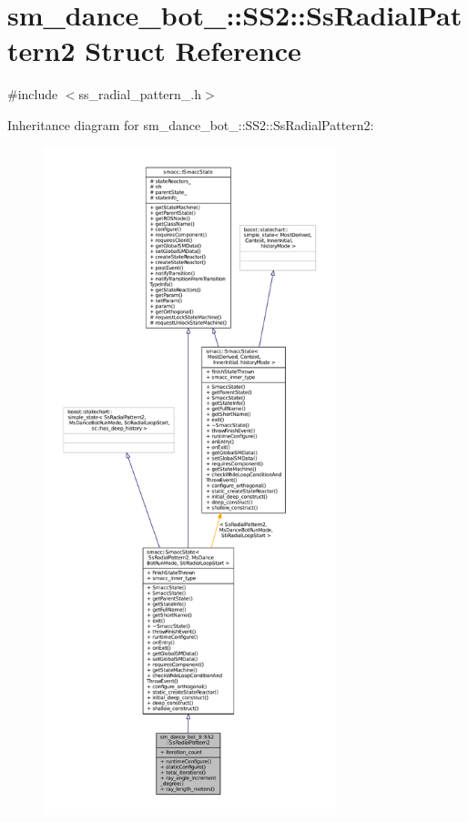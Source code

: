 \hypertarget{structsm__dance__bot__3_1_1SS2_1_1SsRadialPattern2}{}\section{sm\+\_\+dance\+\_\+bot\+\_\+:\+:S\+S2\+:\+:Ss\+Radial\+Pattern2 Struct Reference}
\label{structsm__dance__bot__3_1_1SS2_1_1SsRadialPattern2}


{\ttfamily \#include $<$ss\+\_\+radial\+\_\+pattern\+\_.\+h$>$}



Inheritance diagram for sm\+\_\+dance\+\_\+bot\+\_\+:\+:S\+S2\+:\+:Ss\+Radial\+Pattern2\+:
\nopagebreak
\begin{figure}[H]
\begin{center}
\leavevmode
\includegraphics[height=550pt]{structsm__dance__bot__3_1_1SS2_1_1SsRadialPattern2__inherit__graph}
\end{center}
\end{figure}


